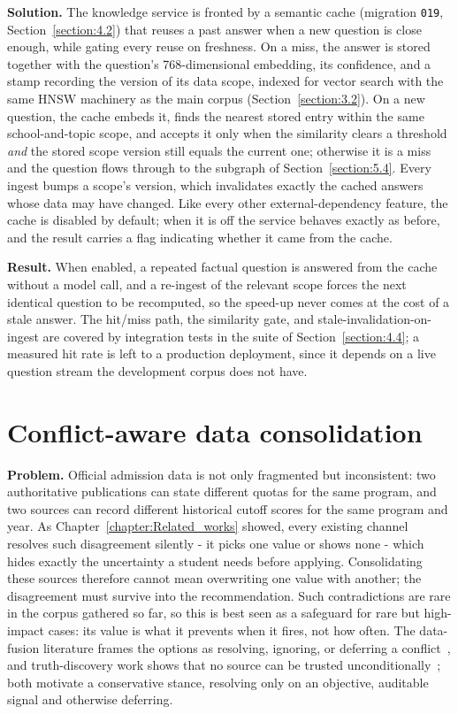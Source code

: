 \documentclass[../main.tex]{subfiles}
\begin{document}
\textbf{Solution.}
The knowledge service is fronted by a semantic cache (migration \texttt{019}, Section~\ref{section:4.2}) that reuses a past answer when a new question is close enough, while gating every reuse on freshness.
On a miss, the answer is stored together with the question's 768-dimensional embedding, its confidence, and a stamp recording the version of its data scope, indexed for vector search with the same \gls{HNSW} machinery as the main corpus (Section~\ref{section:3.2}).
On a new question, the cache embeds it, finds the nearest stored entry within the same school-and-topic scope, and accepts it only when the similarity clears a threshold \textit{and} the stored scope version still equals the current one; otherwise it is a miss and the question flows through to the subgraph of Section~\ref{section:5.4}.
Every ingest bumps a scope's version, which invalidates exactly the cached answers whose data may have changed.
Like every other external-dependency feature, the cache is disabled by default; when it is off the service behaves exactly as before, and the result carries a flag indicating whether it came from the cache.

\textbf{Result.}
When enabled, a repeated factual question is answered from the cache without a model call, and a re-ingest of the relevant scope forces the next identical question to be recomputed, so the speed-up never comes at the cost of a stale answer.
The hit/miss path, the similarity gate, and stale-invalidation-on-ingest are covered by integration tests in the suite of Section~\ref{section:4.4}; a measured hit rate is left to a production deployment, since it depends on a live question stream the development corpus does not have.

\section{Conflict-aware data consolidation}
\label{section:5.6}

\textbf{Problem.}
Official admission data is not only fragmented but inconsistent: two authoritative publications can state different quotas for the same program, and two sources can record different historical cutoff scores for the same program and year.
As Chapter~\ref{chapter:Related_works} showed, every existing channel resolves such disagreement silently - it picks one value or shows none - which hides exactly the uncertainty a student needs before applying.
Consolidating these sources therefore cannot mean overwriting one value with another; the disagreement must survive into the recommendation.
Such contradictions are rare in the corpus gathered so far, so this is best seen as a safeguard for rare but high-impact cases: its value is what it prevents when it fires, not how often.
The data-fusion literature frames the options as resolving, ignoring, or deferring a conflict~\cite{bleiholder2009fusion}, and truth-discovery work shows that no source can be trusted unconditionally~\cite{li2016truth}; both motivate a conservative stance, resolving only on an objective, auditable signal and otherwise deferring.
\end{document}
